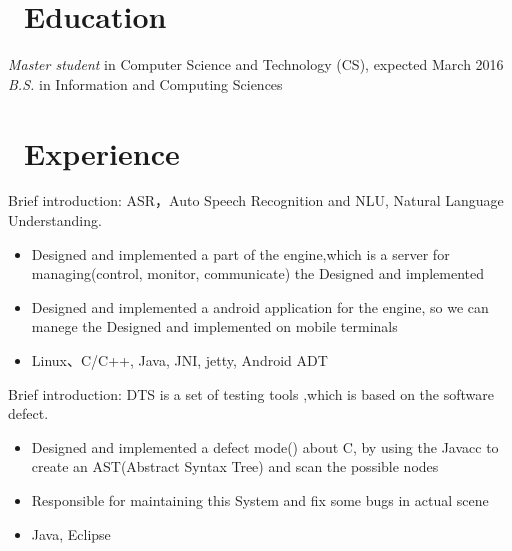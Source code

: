 \documentclass{resume}
\begin{document}



\section{\faGraduationCap\ Education}
\textit{Master student} in Computer Science and Technology (CS), expected March 2016
\textit{B.S.} in Information and Computing Sciences

\section{\faBriefcase\ Experience}
Brief introduction: ASR，Auto Speech Recognition and NLU, Natural Language Understanding.
\begin{itemize}
  \item Designed and implemented a part of the engine,which is a server for managing(control, monitor, communicate) the Designed and implemented
  \item Designed and implemented a android application for the engine, so we can manege the Designed and implemented on mobile terminals
  \item Linux、C/C++, Java, JNI, jetty, Android ADT
\end{itemize}

Brief introduction: DTS is a set of testing tools ,which is based on the software defect.
\begin{itemize}
  \item Designed and implemented a defect mode() about C, by using the Javacc to create an AST(Abstract Syntax Tree) and scan the possible nodes
  \item Responsible for maintaining this System and fix some bugs in actual scene
  \item Java, Eclipse
\end{itemize}
\end{document}
